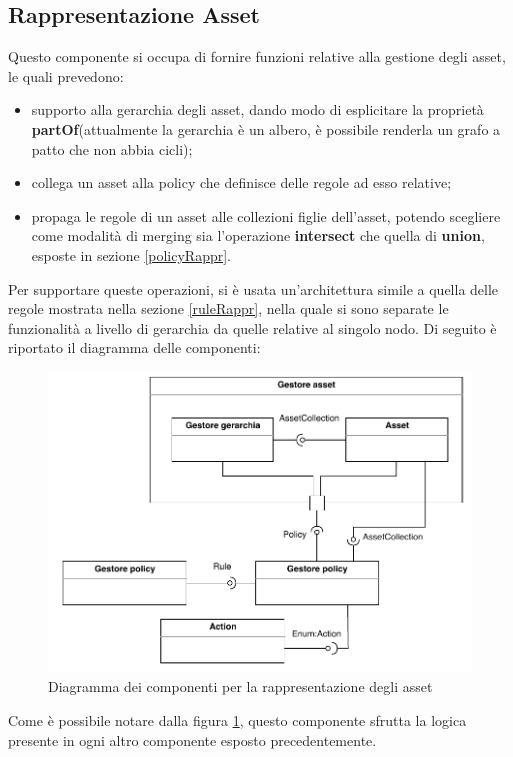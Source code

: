 \documentclass[12pt,a4paper,twoside]{book}
\begin{document}
\subsection{Rappresentazione Asset}\label{assetFun}
Questo componente si occupa di fornire funzioni relative alla gestione degli asset, le quali prevedono:
\begin{itemize}
\item supporto alla gerarchia degli asset, dando modo di esplicitare la proprietà \textbf{partOf}(attualmente la gerarchia è un albero, è possibile renderla un grafo a patto che non abbia cicli);
\item collega un asset alla policy che definisce delle regole ad esso relative;
\item propaga le regole di un asset alle collezioni figlie dell'asset, potendo scegliere come modalità di merging sia l'operazione \textbf{intersect} che quella di \textbf{union}, esposte in sezione \ref{policyRappr}.
\end{itemize}
Per supportare queste operazioni, si è usata un'architettura simile a quella delle regole mostrata nella sezione \ref{ruleRappr}, nella quale si sono separate le funzionalità a livello di gerarchia da quelle relative al singolo nodo. Di seguito è riportato il diagramma delle componenti:
\begin{figure}[H]
\centering
\includegraphics[scale=.7]{../immagini/compAsset.pdf}
\caption{Diagramma dei componenti per la rappresentazione degli asset}
\label{compAssetImg}
\end{figure}
Come è possibile notare dalla figura \ref{compAssetImg}, questo componente sfrutta la logica presente in ogni altro componente esposto precedentemente.\\
\end{document}
